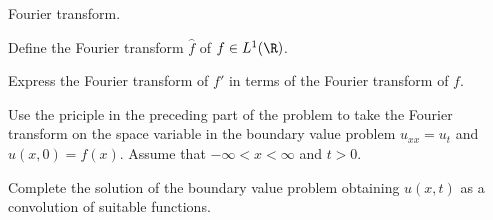 Fourier transform.
\begin{alist}
\item Define the Fourier transform $\hat{f}$ of $f\in L^1(\R)$.
\item Express the Fourier transform of $f'$ in terms of the Fourier
transform of $f$.
\item Use the priciple in the preceding part of the problem to take 
the Fourier transform on the space variable in the boundary value
problem $u_{xx}=u_t$ and $u(x,0)=f(x)$. Assume that $-\infty<x<\infty$
and $t>0$.
\item Complete the solution of the boundary value problem obtaining
$u(x,t)$ as a convolution of suitable functions.
\end{alist}
